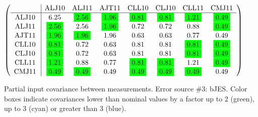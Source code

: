 \begin{table}[H]
\scriptsize
\begin{center}
\renewcommand{\arraystretch}{1.1}
\begin{math}\left(\begin{array}{c|ccccccc}
 & \mathrm{ALJ10} & 
\mathrm{ALJ11} & 
\mathrm{AJT11} & 
\mathrm{CLL10} & 
\mathrm{CLJ10} & 
\mathrm{CLL11} & 
\mathrm{CMJ11} \\
\hline
\mathrm{ALJ10} \hspace*{2pt} &       6.25 &  \colorbox{Green1}{$      2.56$} &  \colorbox{Green1}{$      1.96$} &  \colorbox{Green1}{$      0.81$} &  \colorbox{Green1}{$      0.81$} &  \colorbox{Green1}{$      1.21$} &  \colorbox{Green1}{$      0.49$} \\
\mathrm{ALJ11} \hspace*{2pt} &  \colorbox{Green1}{$      2.56$} &       2.56 &  \colorbox{Green1}{$      1.96$} &       0.72 &       0.72 &       0.88 &  \colorbox{Green1}{$      0.49$} \\
\mathrm{AJT11} \hspace*{2pt} &  \colorbox{Green1}{$      1.96$} &  \colorbox{Green1}{$      1.96$} &       1.96 &       0.63 &       0.63 &       0.77 &       0.49 \\
\mathrm{CLL10} \hspace*{2pt} &  \colorbox{Green1}{$      0.81$} &       0.72 &       0.63 &       0.81 &       0.81 &  \colorbox{Green1}{$      0.81$} &  \colorbox{Green1}{$      0.49$} \\
\mathrm{CLJ10} \hspace*{2pt} &  \colorbox{Green1}{$      0.81$} &       0.72 &       0.63 &       0.81 &       0.81 &  \colorbox{Green1}{$      0.81$} &  \colorbox{Green1}{$      0.49$} \\
\mathrm{CLL11} \hspace*{2pt} &  \colorbox{Green1}{$      1.21$} &       0.88 &       0.77 &  \colorbox{Green1}{$      0.81$} &  \colorbox{Green1}{$      0.81$} &       1.21 &  \colorbox{Green1}{$      0.49$} \\
\mathrm{CMJ11} \hspace*{2pt} &  \colorbox{Green1}{$      0.49$} &  \colorbox{Green1}{$      0.49$} &       0.49 &  \colorbox{Green1}{$      0.49$} &  \colorbox{Green1}{$      0.49$} &  \colorbox{Green1}{$      0.49$} &       0.49 \\
\end{array}\right)\end{math}
\caption{Partial input covariance between measurements. Error source \#3: bJES. Color boxes indicate covariances lower than nominal values by a factor up to 2 (green), up to 3 (cyan) or greater than 3 (blue).}
\renewcommand{\arraystretch}{1}
\end{center}
\end{table}
